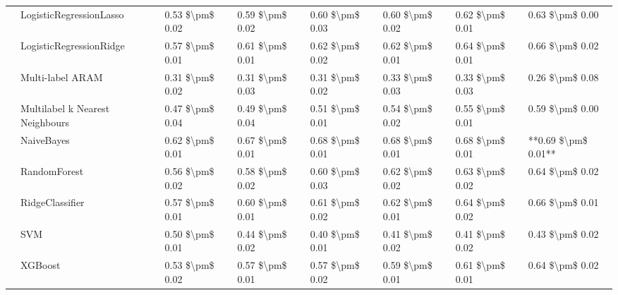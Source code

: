 \begin{tabular}{llllllll}
   & LogisticRegressionLasso &  0.53 \$\textbackslash pm\$ 0.02 &           0.59 \$\textbackslash pm\$ 0.02 &       0.60 \$\textbackslash pm\$ 0.03 &        0.60 \$\textbackslash pm\$ 0.02 &                         0.62 \$\textbackslash pm\$ 0.01 &      0.63 \$\textbackslash pm\$ 0.00 \\
   & LogisticRegressionRidge &  0.57 \$\textbackslash pm\$ 0.01 &           0.61 \$\textbackslash pm\$ 0.01 &       0.62 \$\textbackslash pm\$ 0.02 &        0.62 \$\textbackslash pm\$ 0.01 &                         0.64 \$\textbackslash pm\$ 0.01 &      0.66 \$\textbackslash pm\$ 0.02 \\
   & Multi-label ARAM &  0.31 \$\textbackslash pm\$ 0.02 &           0.31 \$\textbackslash pm\$ 0.03 &       0.31 \$\textbackslash pm\$ 0.02 &        0.33 \$\textbackslash pm\$ 0.03 &                         0.33 \$\textbackslash pm\$ 0.03 &      0.26 \$\textbackslash pm\$ 0.08 \\
   & Multilabel k Nearest Neighbours &  0.47 \$\textbackslash pm\$ 0.04 &           0.49 \$\textbackslash pm\$ 0.04 &       0.51 \$\textbackslash pm\$ 0.01 &        0.54 \$\textbackslash pm\$ 0.02 &                         0.55 \$\textbackslash pm\$ 0.01 &      0.59 \$\textbackslash pm\$ 0.00 \\
   & NaiveBayes &  0.62 \$\textbackslash pm\$ 0.01 &           0.67 \$\textbackslash pm\$ 0.01 &       0.68 \$\textbackslash pm\$ 0.01 &        0.68 \$\textbackslash pm\$ 0.01 &                         0.68 \$\textbackslash pm\$ 0.01 &  **0.69 \$\textbackslash pm\$ 0.01** \\
   & RandomForest &  0.56 \$\textbackslash pm\$ 0.02 &           0.58 \$\textbackslash pm\$ 0.02 &       0.60 \$\textbackslash pm\$ 0.03 &        0.62 \$\textbackslash pm\$ 0.02 &                         0.63 \$\textbackslash pm\$ 0.02 &      0.64 \$\textbackslash pm\$ 0.02 \\
   & RidgeClassifier &  0.57 \$\textbackslash pm\$ 0.01 &           0.60 \$\textbackslash pm\$ 0.01 &       0.61 \$\textbackslash pm\$ 0.02 &        0.62 \$\textbackslash pm\$ 0.01 &                         0.64 \$\textbackslash pm\$ 0.02 &      0.66 \$\textbackslash pm\$ 0.01 \\
   & SVM &  0.50 \$\textbackslash pm\$ 0.01 &           0.44 \$\textbackslash pm\$ 0.02 &       0.40 \$\textbackslash pm\$ 0.01 &        0.41 \$\textbackslash pm\$ 0.02 &                         0.41 \$\textbackslash pm\$ 0.02 &      0.43 \$\textbackslash pm\$ 0.02 \\
   & XGBoost &  0.53 \$\textbackslash pm\$ 0.02 &           0.57 \$\textbackslash pm\$ 0.01 &       0.57 \$\textbackslash pm\$ 0.02 &        0.59 \$\textbackslash pm\$ 0.01 &                         0.61 \$\textbackslash pm\$ 0.01 &      0.64 \$\textbackslash pm\$ 0.02 \\

\end{tabular}
